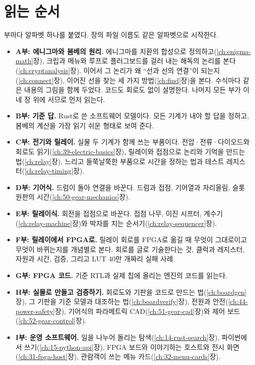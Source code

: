 \section{읽는 순서}

부마다 알파벳 하나를 붙였다. 장의 파일 이름도 같은 알파벳으로 시작한다.

\begin{itemize}
\item \textbf{A부: 에니그마와 봄베의 원리.} 에니그마를 치환의 합성으로 정의하고(\ref{ch:enigma-math}장), 크립과
메뉴와 루프로 플러그보드를 걸러 내는 해독의 논리를 본다(\ref{ch:cryptanalysis}장). 이어서 그 논리가 왜 ``선과 선의
연결''이 되는지(\ref{ch:connect}장), 이어진 선을 찾는 세 가지 방법(\ref{ch:find}장)을 본다. 수식마다 같은 내용의 그림을
함께 두었다. 코드도 회로도 없이 설명한다. 나머지 모든 부가 이 네 장 위에 서므로 먼저 읽는다.
\item \textbf{B부: 기준 답.} Rust로 쓴 소프트웨어 모델이다. 모든 기계가 내야 할 답을 정하고, 봄베의 계산을 가장 읽기
쉬운 형태로 보여 준다.
\item \textbf{C부: 전기와 릴레이.} 실물 두 기계가 함께 쓰는 부품이다. 전압·전류·다이오드와 회로도
읽기(\ref{ch:39-electric-basics}장), 릴레이와 접점으로 논리와 기억을 만드는 법(\ref{ch:relay}장), 느리고 들쭉날쭉한
부품으로 시간을 정하는 법과 테스트 레지스터(\ref{ch:relay-timing}장).
\item \textbf{D부: 기어식.} 드럼이 돌아 연결을 바꾼다. 드럼과 접점, 기어열과 자리올림, 슬롯 원판의 시간(\ref{ch:50-gear-mechanics}장).
\item \textbf{E부: 릴레이식.} 회전을 접점으로 바꾼다. 접점 나무, 이진 시프터, 계수기(\ref{ch:relay-machine}장)와
박자를 치는 순서기(\ref{ch:relay-sequencer}장).
\item \textbf{F부: 릴레이에서 FPGA로.} 릴레이 회로를 FPGA로 옮길 때 무엇이 그대로이고 무엇이 바뀌는지를 개념별로
본다. 회로를 글로 기술한다는 것, 클럭과 레지스터, 자원과 시간, 검증, 그리고 LUT 40만 개짜리 실패 사례.
\item \textbf{G부: FPGA 코드.} 기준 RTL과 실제 칩에 올리는 엔진의 코드를 읽는다.
\item \textbf{H부: 실물로 만들고 검증하기.} 회로도와 기판을 코드로 만드는 법(\ref{ch:boardgen}장), 그 기판을
기준 모델과 대조하는 법(\ref{ch:boardverify}장), 전원과 안전(\ref{ch:44-power-safety}장), 기어식의 파라메트릭
CAD(\ref{ch:51-gear-cad}장)와 제어 보드(\ref{ch:52-gear-control}장).
\item \textbf{I부: 운영 소프트웨어.} 일을 나누어 돌리는 탐색(\ref{ch:14-rust-search}장), 파이썬에서 쓰기(\ref{ch:15-python-api}장),
FPGA 보드와 이야기하는 호스트와 전시 화면(\ref{ch:31-fpga-host}장), 관람객이 쓰는 메뉴 카드(\ref{ch:32-menu-cards}장).
\end{itemize}

